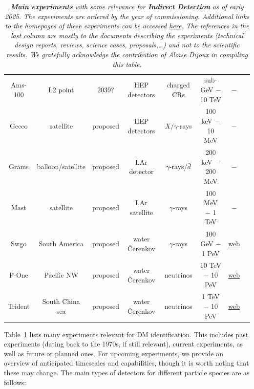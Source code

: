 \begin{table}[p]
\begin{center}
{\begin{tabular}{cccccccc}
{\sc  Ams-100} & L2 point & 2039? & HEP detectors & charged CRs & sub-GeV $-$ 10 TeV & $-$ & \cite{AMS100} \\
{\sc  Gecco} & satellite & proposed & HEP detectors & $X/\gamma$-rays & 100 keV $-$ 10 MeV  & $-$ &\cite{Gecco} \\
{\sc  Grams} & balloon/satellite & proposed & LAr detector & $\gamma$-rays/$\bar d$ & 200 keV $-$ 200 MeV  & $-$ &\cite{GRAMS} \\
{\sc  Mast} & satellite & proposed & LAr satellite & $\gamma$-rays & 100 MeV $-$ 1 TeV  & $-$ &\cite{MAST} \\
{\sc  Swgo} & South America & proposed & water \v Cerenkov & $\gamma$-rays & 100 GeV $-$ 1 PeV  & \href{https://www.swgo.org/}{web} &\cite{SWGO} \\
{\sc  P-One} & Pacific NW & proposed & water \v Cerenkov & neutrinos & 10 TeV $-$ 10 PeV  & \href{https://www.pacific-neutrino.org/}{web} &\cite{P-ONE} \\
{\sc  Trident} & South China sea & proposed & water \v Cerenkov & neutrinos & 1 TeV $-$ 10 PeV  & \href{https://trident.sjtu.edu.cn/en}{web} &\cite{TRIDENT} \\   
\hline \hline
\end{tabular}}
\vspace{-0.3cm}
\caption[Main indirect detection experiments]{\em  {\bfseries Main experiments} with some relevance for {\bfseries Indirect Detection} as of early 2025. The experiments are ordered by the year of commissioning. Additional links to the homepages of these experiments can be accessed \href{https://www.mpi-hd.mpg.de/hfm/CosmicRay/CosmicRaySites.html}{here}. The references in the last column are mostly to the documents describing the experiments (technical design reports, reviews, science cases, proposals,\ldots) and not to the scientific results. We gratefully acknowledge the contribution of Alo\"ise Dijoux in compiling this table. 
\label{tab:IDexp}}
\end{center}
\end{table}



Table~\ref{tab:IDexp} lists many experiments relevant for DM identification.
This includes past experiments (dating back to the 1970s, if still relevant), current experiments, as well as future or planned ones. 
 For upcoming experiments, we provide an overview of anticipated timescales and capabilities, though it is worth noting that these may change.
The main types of detectors for different particle species are as follows: 

